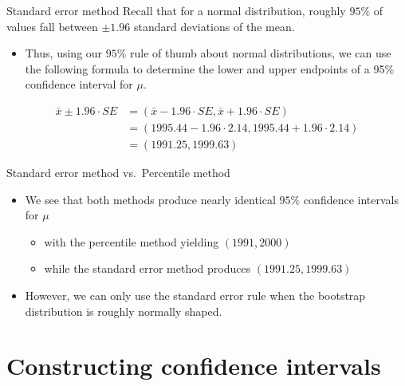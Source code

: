 \documentclass[
  ignorenonframetext,
]{beamer}
\providecommand{\tightlist}{%
  \setlength{\itemsep}{0pt}\setlength{\parskip}{0pt}}
\begin{document}
\begin{frame}{Standard error method}
\protect\hypertarget{standard-error-method-2}{}
Recall that for a normal distribution, roughly \(95\%\) of values fall
between \(\pm1.96\) standard deviations of the mean.

\begin{itemize}
\tightlist
\item
  Thus, using our \(95\%\) rule of thumb about normal distributions, we
  can use the following formula to determine the lower and upper
  endpoints of a 95\% confidence interval for \(\mu\).
\end{itemize}

\[\begin{array}{ll}
\bar{x}\pm1.96\cdot SE&=(\bar{x}-1.96\cdot SE, \bar{x}+1.96\cdot SE)\\
&=(1995.44-1.96\cdot 2.14, 1995.44+1.96\cdot2.14)\\
&=(1991.25,1999.63)
\end{array}\]
\end{frame}

\begin{frame}{Standard error method vs.~Percentile method}
\protect\hypertarget{standard-error-method-vs.-percentile-method}{}
\begin{itemize}
\item
  We see that both methods produce nearly identical \(95\%\) confidence
  intervals for \(\mu\)

  \begin{itemize}
  \tightlist
  \item
    with the percentile method yielding \((1991, 2000)\)
  \item
    while the standard error method produces \((1991.25, 1999.63)\)
  \end{itemize}
\item
  However, we can only use the standard error rule when the bootstrap
  distribution is roughly normally shaped.
\end{itemize}
\end{frame}

\hypertarget{constructing-confidence-intervals}{%
\section{Constructing confidence
intervals}\label{constructing-confidence-intervals}}
\end{document}
